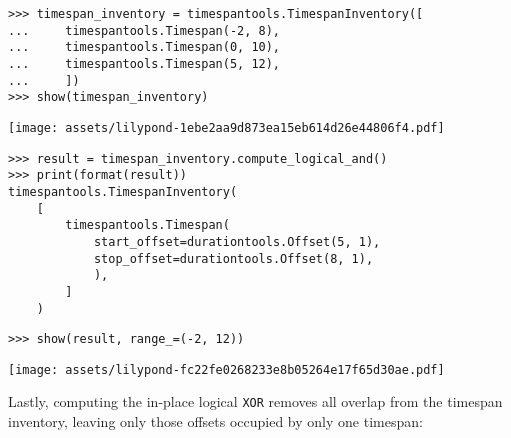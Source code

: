 \begin{abjadbookoutput}
\begin{singlespacing}
\vspace{-0.5\baselineskip}
\begin{lstlisting}
>>> timespan_inventory = timespantools.TimespanInventory([
...     timespantools.Timespan(-2, 8),
...     timespantools.Timespan(0, 10),
...     timespantools.Timespan(5, 12),
...     ])
>>> show(timespan_inventory)
\end{lstlisting}
\noindent\texttt{[image: assets/lilypond-1ebe2aa9d873ea15eb614d26e44806f4.pdf]}
\begin{lstlisting}
>>> result = timespan_inventory.compute_logical_and()
>>> print(format(result))
timespantools.TimespanInventory(
    [
        timespantools.Timespan(
            start_offset=durationtools.Offset(5, 1),
            stop_offset=durationtools.Offset(8, 1),
            ),
        ]
    )
\end{lstlisting}
\begin{lstlisting}
>>> show(result, range_=(-2, 12))
\end{lstlisting}
\noindent\texttt{[image: assets/lilypond-fc22fe0268233e8b05264e17f65d30ae.pdf]}
\end{singlespacing}
\end{abjadbookoutput}

\noindent Lastly, computing the in-place logical \texttt{XOR} removes all
overlap from the timespan inventory, leaving only those offsets occupied by
only one timespan:

\begin{comment}
<abjad>
timespan_inventory = timespantools.TimespanInventory([
    timespantools.Timespan(-2, 2),
    timespantools.Timespan(0, 10),
    timespantools.Timespan(5, 12),
    ])
show(timespan_inventory)
result = timespan_inventory.compute_logical_xor()
print(format(result))
show(result, range_=(-2, 12))
</abjad>
\end{comment}

